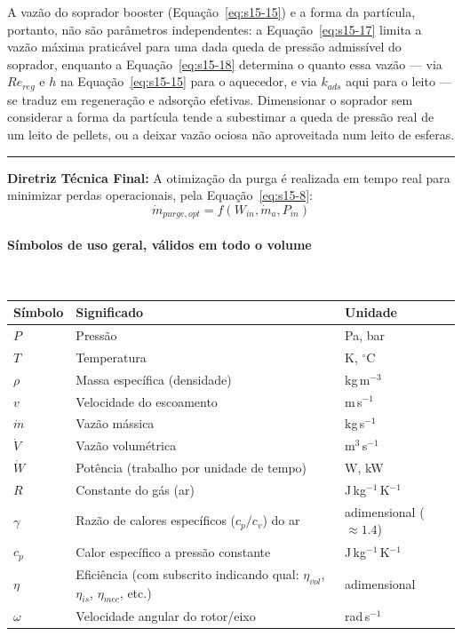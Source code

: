 \documentclass[12pt,a4paper]{article}
\numberwithin{equation}{section}
\numberwithin{table}{section}
\numberwithin{figure}{section}
\begin{document}
{\begin{itemize}
		\end{itemize}
		A vazão do soprador booster (Equação~\eqref{eq:s15-15}) e a forma da partícula, portanto, não são parâmetros independentes: a Equação~\eqref{eq:s15-17} limita a vazão máxima praticável para uma dada queda de pressão admissível do soprador, enquanto a Equação~\eqref{eq:s15-18} determina o quanto essa vazão — via $Re_{reg}$ e $h$ na Equação~\eqref{eq:s15-15} para o aquecedor, e via $k_{ads}$ aqui para o leito — se traduz em regeneração e adsorção efetivas. Dimensionar o soprador sem considerar a forma da partícula tende a subestimar a queda de pressão real de um leito de pellets, ou a deixar vazão ociosa não aproveitada num leito de esferas.

		\vspace{1em}
		\hrule
		\vspace{1em}

		\textbf{Diretriz Técnica Final:} A otimização da purga é realizada em tempo real para minimizar perdas operacionais, pela Equação~\eqref{eq:s15-8}:
		\begin{equation}\label{eq:s15-8}
\boxed{\dot{m}_{purge,opt} = f(W_{in}, \dot{m}_a, P_{in})}
\end{equation}
	
	
\paragraph{Símbolos de uso geral, válidos em todo o volume}\mbox{}\\[-0.5em]
{\small
\begin{longtable}{>{\raggedright\arraybackslash}p{2.6cm} >{\raggedright\arraybackslash}p{9.2cm} >{\raggedright\arraybackslash}p{2.6cm}}
	\toprule
	\textbf{Símbolo} & \textbf{Significado} & \textbf{Unidade} \\ \midrule
	\endhead
	$P$ & Pressão & Pa, bar \\
	$T$ & Temperatura & K, $^{\circ}$C \\
	$\rho$ & Massa específica (densidade) & kg\,m$^{-3}$ \\
	$v$ & Velocidade do escoamento & m\,s$^{-1}$ \\
	$\dot{m}$ & Vazão mássica & kg\,s$^{-1}$ \\
	$\dot{V}$ & Vazão volumétrica & m$^3$\,s$^{-1}$ \\
	$\dot{W}$ & Potência (trabalho por unidade de tempo) & W, kW \\
	$R$ & Constante do gás (ar) & J\,kg$^{-1}$\,K$^{-1}$ \\
	$\gamma$ & Razão de calores específicos ($c_p/c_v$) do ar & adimensional ($\approx 1.4$) \\
	$c_p$ & Calor específico a pressão constante & J\,kg$^{-1}$\,K$^{-1}$ \\
	$\eta$ & Eficiência (com subscrito indicando qual: $\eta_{vol}$, $\eta_{is}$, $\eta_{mec}$, etc.) & adimensional \\
	$\omega$ & Velocidade angular do rotor/eixo & rad\,s$^{-1}$ \\
	\bottomrule
\end{longtable}
}
\clearpage
}
\end{document}
